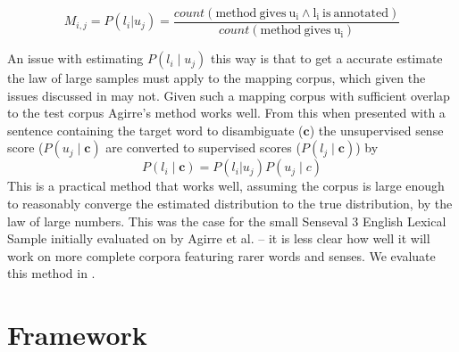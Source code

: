 \documentclass{sig-alternate}
\renewcommand{\c}{\mathbf{c}}
\begin{document}
\begin{equation} \label{eq:agirremap}
M_{i,j} = P(l_i | u_j) = \frac{count(\mathrm{method\: gives\: u_i \wedge l_i\: is\: annotated})}{count(\mathrm{method\: gives\: u_i})}
\end{equation}

An issue with estimating $P(l_i \mid u_j)$ this way is that to get a accurate estimate the law of large samples must apply to the mapping corpus, which given the issues discussed in  may not. Given such a mapping corpus with sufficient overlap to the test corpus Agirre's method works well.
From this  when presented with a sentence containing the target word to disambiguate ($\c$) the unsupervised sense score ($P(u_j \mid \c)$ are converted to supervised scores ($P(l_j \mid \c)$) by
\begin{equation} \label{eq:agireewsd}
P(l_i \mid \c) = P(l_i | u_j) P(u_j \mid c)
\end{equation}
This is a practical method that works well, assuming the corpus is large enough to reasonably converge the estimated distribution to the true distribution, by the law of large numbers. This was the case for the small Senseval 3 English Lexical Sample \parencite{mihalcea2004senseval} initially evaluated on by Agirre et al. -- it is less clear how well it will work on more complete corpora featuring rarer words and senses.
We evaluate this method in .



\section{Framework} \label{Frameword}
\end{document}
